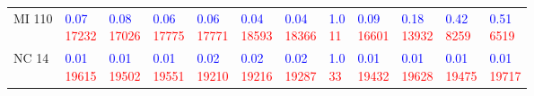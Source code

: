 \begin{tabular}{llllllllllll}
MI 110 &  \makecell{\textcolor{blue}{0.07} \\ \textcolor{red}{17232}} &  \makecell{\textcolor{blue}{0.08} \\ \textcolor{red}{17026}} &  \makecell{\textcolor{blue}{0.06} \\ \textcolor{red}{17775}} &  \makecell{\textcolor{blue}{0.06} \\ \textcolor{red}{17771}} &  \makecell{\textcolor{blue}{0.04} \\ \textcolor{red}{18593}} &  \makecell{\textcolor{blue}{0.04} \\ \textcolor{red}{18366}} &    \makecell{\textcolor{blue}{1.0} \\ \textcolor{red}{11}} &  \makecell{\textcolor{blue}{0.09} \\ \textcolor{red}{16601}} &  \makecell{\textcolor{blue}{0.18} \\ \textcolor{red}{13932}} &   \makecell{\textcolor{blue}{0.42} \\ \textcolor{red}{8259}} &   \makecell{\textcolor{blue}{0.51} \\ \textcolor{red}{6519}} \\
NC 14  &  \makecell{\textcolor{blue}{0.01} \\ \textcolor{red}{19615}} &  \makecell{\textcolor{blue}{0.01} \\ \textcolor{red}{19502}} &  \makecell{\textcolor{blue}{0.01} \\ \textcolor{red}{19551}} &  \makecell{\textcolor{blue}{0.02} \\ \textcolor{red}{19210}} &  \makecell{\textcolor{blue}{0.02} \\ \textcolor{red}{19216}} &  \makecell{\textcolor{blue}{0.02} \\ \textcolor{red}{19287}} &    \makecell{\textcolor{blue}{1.0} \\ \textcolor{red}{33}} &  \makecell{\textcolor{blue}{0.01} \\ \textcolor{red}{19432}} &  \makecell{\textcolor{blue}{0.01} \\ \textcolor{red}{19628}} &  \makecell{\textcolor{blue}{0.01} \\ \textcolor{red}{19475}} &  \makecell{\textcolor{blue}{0.01} \\ \textcolor{red}{19717}} \\

\end{tabular}
